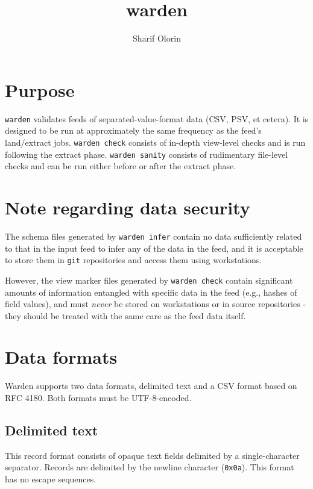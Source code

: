 \documentclass[a4paper]{article}
\title{warden}
\author{Sharif Olorin}
\begin{document}
\maketitle

\tableofcontents

\newpage

\section{Purpose}\label{usage}

\texttt{warden} validates feeds of separated-value-format data (CSV,
PSV, et cetera). It is designed to be run at approximately the same
frequency as the feed's land/extract jobs. \texttt{warden check}
consists of in-depth view-level checks and is run following the
extract phase. \texttt{warden sanity} consists of rudimentary
file-level checks and can be run either before or after the extract
phase.

\section{Note regarding data security}\label{note-regarding-data-security}

The schema files generated by \texttt{warden infer} contain no data
sufficiently related to that in the input feed to infer any of the
data in the feed, and it is acceptable to store them in
\texttt{git} repositories and access them using workstations.

However, the view marker files generated by \texttt{warden check}
contain significant amounts of information entangled with specific data in
the feed (e.g., hashes of field values), and must \textit{never}
be stored on workstations or in source repositories - they should be
treated with the same care as the feed data itself.

\section{Data formats}\label{data-formats}

Warden supports two data formats, delimited text and a CSV format
based on RFC 4180.\cite{rfc4180} Both formats must be UTF-8-encoded.

\subsection{Delimited text}

This record format consists of opaque text fields delimited by a
single-character separator. Records are delimited by the newline
character (\texttt{0x0a}). This format has no escape sequences.
\end{document}
